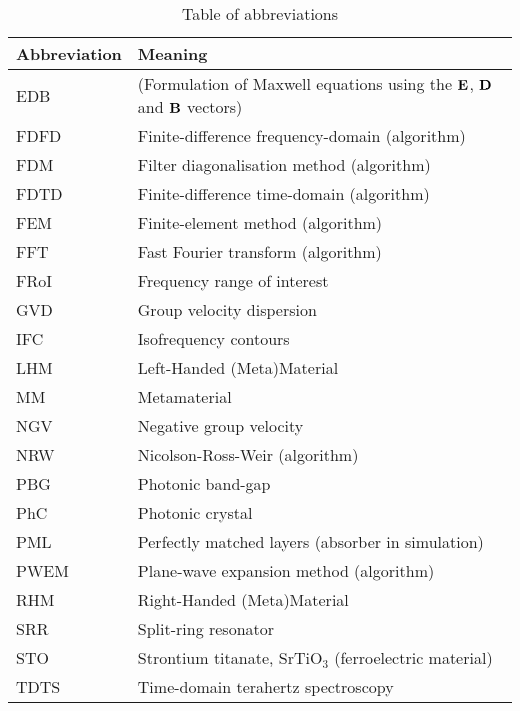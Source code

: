 \begin{table}[ht]   \caption{Table of abbreviations}  \label{tb_shortcuts} \centering 
\begin{tabular}{ll}
 \toprule
Abbreviation & Meaning	\\
 \hline
EDB			& (Formulation of Maxwell equations using the $\mathbf{E}$, $\mathbf{D}$ and $\mathbf{B}$ vectors)\\
FDFD 		& Finite-difference frequency-domain (algorithm)\\
FDM 		& Filter diagonalisation method (algorithm)\\
FDTD 		& Finite-difference time-domain (algorithm)\\
FEM 		& Finite-element method (algorithm)\\
FFT 		& Fast Fourier transform (algorithm)\\
FRoI 		& Frequency range of interest\\
GVD 		& Group velocity dispersion \\
IFC			& Isofrequency contours\\
LHM			& Left-Handed (Meta)Material\\ 
MM			& Metamaterial\\
NGV 		& Negative group velocity\\
NRW 		& Nicolson-Ross-Weir (algorithm)\\
PBG			& Photonic band-gap\\
PhC 		& Photonic crystal\\
PML 		& Perfectly matched layers (absorber in simulation)\\
PWEM 		& Plane-wave expansion method (algorithm)\\
RHM 		& Right-Handed (Meta)Material\\ 
SRR			& Split-ring resonator\\
STO			& Strontium titanate, SrTiO$_3$ (ferroelectric material)\\
TDTS 		& Time-domain terahertz spectroscopy\\
 \bottomrule
 \end{tabular} \end{table}

